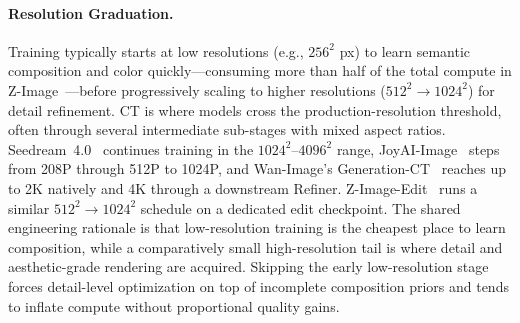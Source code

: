 \documentclass{llmxive}
\begin{document}
\paragraph{Resolution Graduation.}
{Training typically starts at low resolutions (e.g., $256^2$ px) to learn semantic composition and color quickly---consuming more than half of the total compute in Z-Image~\citep{cai2025z}---before progressively scaling to higher resolutions ($512^2 \rightarrow 1024^2$) for detail refinement. CT is where models cross the production-resolution threshold, often through several intermediate sub-stages with mixed aspect ratios. Seedream~4.0~\citep{seedream2025seedream} continues training in the $1024^2$--$4096^2$ range, JoyAI-Image~\citep{jdjoyaiimage} steps from 208P through 512P to 1024P, and Wan-Image's Generation-CT~\citep{mao2026wan} reaches up to 2K natively and 4K through a downstream Refiner. Z-Image-Edit~\citep{cai2025z} runs a similar $512^2 \rightarrow 1024^2$ schedule on a dedicated edit checkpoint. The shared engineering rationale is that low-resolution training is the cheapest place to learn composition, while a comparatively small high-resolution tail is where detail and aesthetic-grade rendering are acquired. Skipping the early low-resolution stage forces detail-level optimization on top of incomplete composition priors and tends to inflate compute without proportional quality gains.}
\end{document}

